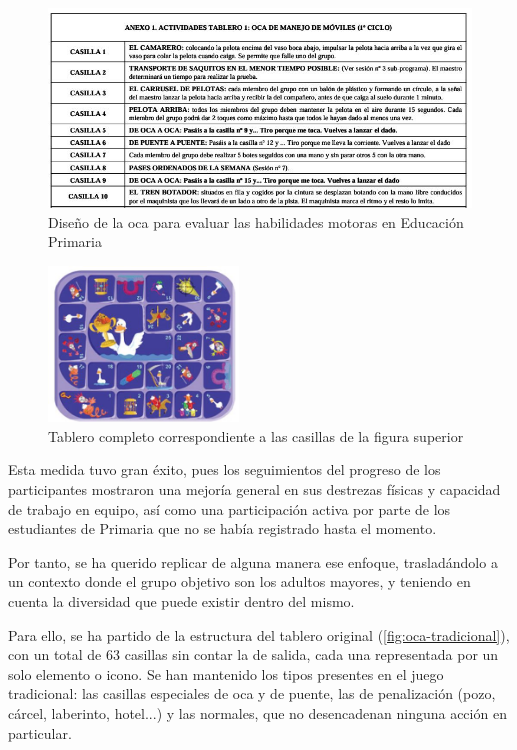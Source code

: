 \begin{figure}[H]
	\centering
	\includegraphics[width=1\textwidth]{imgs/casillas-oca-primaria.JPG}
	\caption{Diseño de la oca para evaluar las habilidades motoras en Educación Primaria \parencite{experienciaOca}}
	\label{fig:casillas-oca-primaria}
\end{figure}

\begin{figure}[H]
	\centering
	\includegraphics[width=0.45\textwidth]{imgs/oca-primaria.JPG}
	\caption{Tablero completo correspondiente a las casillas de la figura superior \parencite{experienciaOca}}
	\label{fig:oca-primaria}
\end{figure}


Esta medida tuvo gran éxito, pues los seguimientos del progreso de los participantes mostraron una mejoría general en sus destrezas físicas y capacidad de trabajo en equipo, así como una participación activa por parte de los estudiantes de Primaria que no se había registrado hasta el momento.

Por tanto, se ha querido replicar de alguna manera ese enfoque, trasladándolo a un contexto donde el grupo objetivo son los adultos mayores, y teniendo en cuenta la diversidad que puede existir dentro del mismo. 

Para ello, se ha partido de la estructura del tablero original (\autoref{fig:oca-tradicional}), con un total de 63 casillas sin contar la de salida, cada una representada por un solo elemento o icono. Se han mantenido los tipos presentes en el juego tradicional: las casillas especiales de oca y de puente, las de penalización (pozo, cárcel, laberinto, hotel...) y las normales, que no desencadenan ninguna acción en particular.


